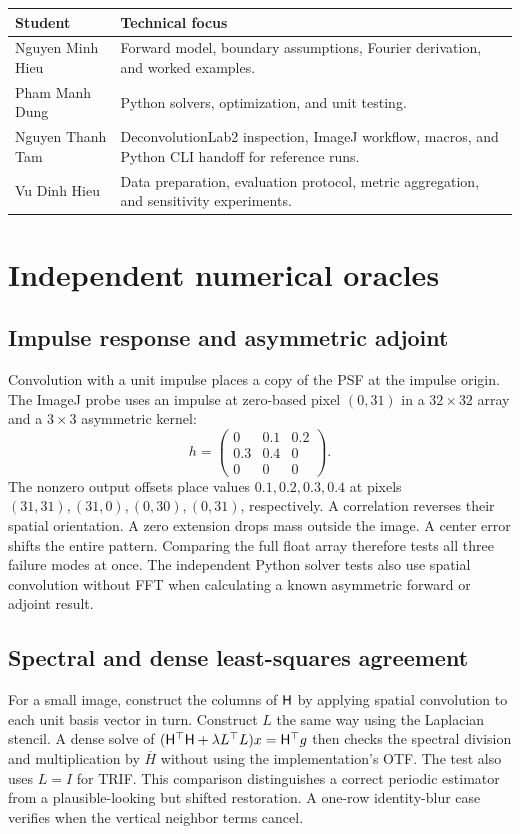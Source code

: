 \begin{tabularx}{\linewidth}{@{}p{.29\linewidth}Y@{}}
\toprule Student & Technical focus\\\midrule
Nguyen Minh Hieu & Forward model, boundary assumptions, Fourier derivation, and worked examples.\\
Pham Manh Dung & Python solvers, optimization, and unit testing.\\
Nguyen Thanh Tam & DeconvolutionLab2 inspection, ImageJ workflow, macros, and Python CLI handoff for reference runs.\\
Vu Dinh Hieu & Data preparation, evaluation protocol, metric aggregation, and sensitivity experiments.\\
\bottomrule
\end{tabularx}

\clearpage
\section{Independent numerical oracles}
\label{app:oracles}

\subsection{Impulse response and asymmetric adjoint}

Convolution with a unit impulse places a copy of the PSF at the impulse origin. The ImageJ probe uses an impulse at zero-based pixel \((0,31)\) in a \(32\times32\) array and a \(3\times3\) asymmetric kernel:
\[
h=\begin{pmatrix}
0&0.1&0.2\\
0.3&0.4&0\\
0&0&0
\end{pmatrix}.
\]
The nonzero output offsets place values \(0.1,0.2,0.3,0.4\) at pixels
\((31,31),(31,0),(0,30),(0,31)\), respectively. A correlation reverses their spatial orientation. A zero extension drops mass outside the image. A center error shifts the entire pattern. Comparing the full float array therefore tests all three failure modes at once. The independent Python solver tests also use spatial convolution without FFT when calculating a known asymmetric forward or adjoint result.

\subsection{Spectral and dense least-squares agreement}

For a small image, construct the columns of \(\mathsf H\) by applying spatial convolution to each unit basis vector in turn. Construct \(L\) the same way using the Laplacian stencil. A dense solve of
\((\mathsf H^\top\mathsf H+\lambda L^\top L)x=\mathsf H^\top g\)
then checks the spectral division and multiplication by \(\overline H\) without using the implementation's OTF. The test also uses \(L=I\) for TRIF. This comparison distinguishes a correct periodic estimator from a plausible-looking but shifted restoration. A one-row identity-blur case verifies when the vertical neighbor terms cancel.

